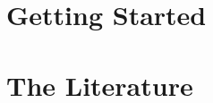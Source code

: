 


\frontmatter


\clearpage{}
\tableofcontents

\mainmatter
\renewcommand{\thesection}{\thechapter.\arabic{section}}
\part{Getting Started}\label{part:start}


\part{The Literature}\label{part:literature}


%   

\appendix


\backmatter
\printbibliography[heading=bibintoc,title={Bibliography}]


